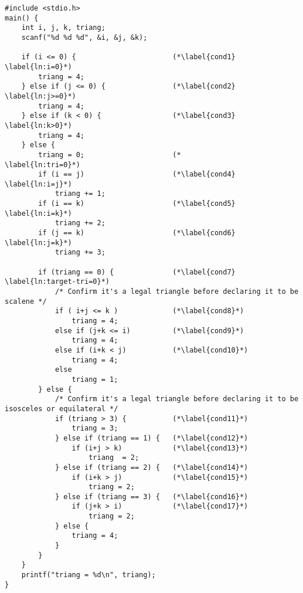 \documentclass{article}
\newenvironment{captionedlisting}{}{}
\begin{document}
\newpage
\begin{captionedlisting}
  \label{lst:tritype-single}
  \begin{lstlisting}
#include <stdio.h>
main() {
    int i, j, k, triang;
    scanf("%d %d %d", &i, &j, &k);

    if (i <= 0) {                       (*\label{cond1} \label{ln:i=0}*)
        triang = 4;
    } else if (j <= 0) {                (*\label{cond2} \label{ln:j>=0}*)
        triang = 4;
    } else if (k < 0) {                 (*\label{cond3} \label{ln:k>0}*)
        triang = 4;
    } else {
        triang = 0;                     (*              \label{ln:tri=0}*)
        if (i == j)                     (*\label{cond4} \label{ln:i=j}*)
            triang += 1;
        if (i == k)                     (*\label{cond5} \label{ln:i=k}*) 
            triang += 2;
        if (j == k)                     (*\label{cond6} \label{ln:j=k}*) 
            triang += 3;

        if (triang == 0) {              (*\label{cond7} \label{ln:target-tri=0}*)
            /* Confirm it's a legal triangle before declaring it to be scalene */
            if ( i+j <= k )             (*\label{cond8}*)
                triang = 4;
            else if (j+k <= i)          (*\label{cond9}*)
                triang = 4;
            else if (i+k < j)           (*\label{cond10}*)
                triang = 4;
            else 
                triang = 1;
        } else {
            /* Confirm it's a legal triangle before declaring it to be isosceles or equilateral */
            if (triang > 3) {           (*\label{cond11}*)
                triang = 3;
            } else if (triang == 1) {   (*\label{cond12}*)
                if (i+j > k)            (*\label{cond13}*)
                    triang  = 2;
            } else if (triang == 2) {   (*\label{cond14}*)
                if (i+k > j)            (*\label{cond15}*)
                    triang = 2;
            } else if (triang == 3) {   (*\label{cond16}*)
                if (j+k > i)            (*\label{cond17}*)
                    triang = 2;
            } else {
                triang = 4;
            }
        }
    } 
    printf("triang = %d\n", triang);
}
  \end{lstlisting}
\end{captionedlisting}
\end{document}
